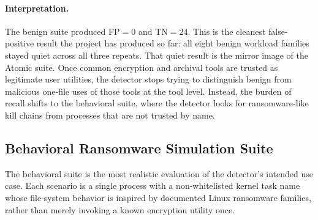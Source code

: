 \documentclass[twocolumn, 10pt]{scrartcl}
\begin{document}
\paragraph{Interpretation.}
The benign suite produced FP$=0$ and TN$=24$. This is the cleanest false-positive result the project has produced so far: all eight benign workload families stayed quiet across all three repeats. That quiet result is the mirror image of the Atomic suite. Once common encryption and archival tools are trusted as legitimate user utilities, the detector stops trying to distinguish benign from malicious one-file uses of those tools at the tool level. Instead, the burden of recall shifts to the behavioral suite, where the detector looks for ransomware-like kill chains from processes that are not trusted by name.
\subsection{Behavioral Ransomware Simulation Suite}
The behavioral suite is the most realistic evaluation of the detector's intended use case. Each scenario is a single process with a non-whitelisted kernel task name whose file-system behavior is inspired by documented Linux ransomware families, rather than merely invoking a known encryption utility once.
\end{document}
